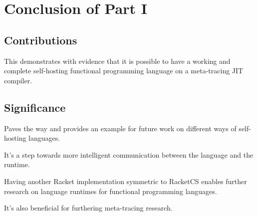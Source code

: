 \chapter{Conclusion of Part I}

	\section{Contributions}
		\begin{mainpoint}
			This demonstrates with evidence that it is possible to have a
			working and complete self-hosting functional programming language
			on a meta-tracing JIT compiler.
		\end{mainpoint}

	\section{Significance}
		\begin{mainpoint}
			Paves the way and provides an example for future work on
			different ways of self-hosting languages.

			It's a step towards more intelligent communication between
			the language and the runtime.

			Having another Racket implementation symmetric to RacketCS 
			enables further research on language runtimes for functional 
			programming languages.

			It's also beneficial for furthering meta-tracing research.
		\end{mainpoint}
